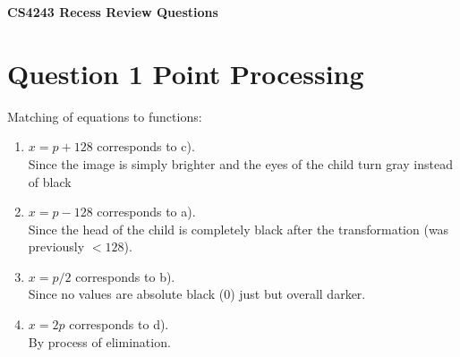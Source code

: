 \documentclass[12pt,letterpaper]{article}
\begin{document}
\textbf{\Large CS4243 Recess Review Questions}

\section*{Question 1 Point Processing}
Matching of equations to functions:
\begin{enumerate}
	\item \( x = p + 128 \) corresponds to c).  \\
	      Since the image is simply brighter and the eyes of the child turn gray instead of black
	\item \( x = p - 128 \) corresponds to a). \\
	      Since the head of the child is completely black after the transformation (was previously \( < 128 \)).
	\item \( x = p/2 \) corresponds to b). \\
	      Since no values are absolute black (\( 0 \)) just but overall darker.
	\item \( x = 2p \) corresponds to d). \\
	      By process of elimination.
\end{enumerate}
\end{document}

